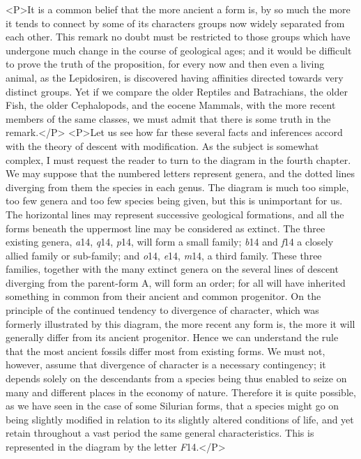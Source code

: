 <P>It is a common belief that the more ancient a form is, by so much the more it tends to connect by some of its characters groups now widely separated from each other. This remark no doubt must be restricted to those groups which have undergone much change in the course of geological ages; and it would be difficult to prove the truth of the proposition, for every now and then even a living animal, as the Lepidosiren, is discovered having affinities directed towards very distinct groups. Yet if we compare the older Reptiles and Batrachians, the older Fish, the older Cephalopods, and the eocene Mammals, with the more recent members of the same classes, we must admit that there is some truth in the remark.</P>
<P>Let us see how far these several facts and inferences accord with the theory of descent with modification. As the subject is somewhat complex, I must request the reader to turn to the diagram in the fourth chapter. We may suppose that the numbered letters represent genera, and the dotted lines diverging from them the species in each genus. The diagram is much too simple, too few genera and too few species being given, but this is unimportant for us. The horizontal lines may represent successive geological formations, and all the forms beneath the uppermost line may be considered as extinct. The three existing genera, \emph{a}14, \emph{q}14, \emph{p}14, will form a small family; \emph{b}14 and \emph{f}14 a closely allied family or sub-family; and \emph{o}14, \emph{e}14, \emph{m}14, a third family. These three families, together with the many extinct genera on the several lines of descent diverging from the parent-form A, will form an order; for all will have inherited something in common from their ancient and common progenitor.  On the principle of the continued tendency to divergence of character, which was formerly illustrated by this diagram, the more recent any form is, the more it will generally differ from its ancient progenitor. Hence we can understand the rule that the most ancient fossils differ most from existing forms. We must not, however, assume that divergence of character is a necessary contingency; it depends solely on the descendants from a species being thus enabled to seize on many and different places in the economy of nature.  Therefore it is quite possible, as we have seen in the case of some Silurian forms, that a species might go on being slightly modified in relation to its slightly altered conditions of life, and yet retain throughout a vast period the same general characteristics.  This is represented in the diagram by the letter \emph{F}14.</P>
